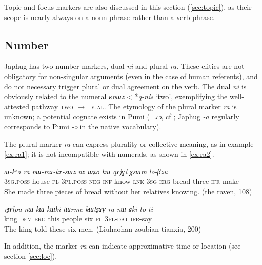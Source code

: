 \documentclass[oneside,a4paper,11pt]{article}
\newcommand{\ipa}[1]{\mbox{\phon\textit{#1}}} %
\begin{document}
Topic and focus markers are also discussed in this section (\ref{sec:topic}), as their scope is nearly always on a noun phrase rather than a verb phrase.

\subsection{Number} \label{sec:number}

Japhug has two number markers, dual \ipa{ni} and plural \ipa{ra}. These clitics are not obligatory for non-singular arguments (even in the case of human referents), and do not necessary trigger plural or dual agreement on the verb. The dual \ipa{ni} is obviously related to the numeral \ipa{ʁnɯz} < *\ipa{q-nis} `two', exemplifying the well-attested pathway \textsc{two} $\rightarrow$ \textsc{dual}. The etymology of the plural marker \ipa{ra} is unknown; a potential cognate exists in Pumi (\ipa{=ɹə}, cf \citealt[135]{daudey14grammar}; Japhug \ipa{-a} regularly corresponds to Pumi \ipa{-ə} in the native vocabulary).
 
  The plural marker \ipa{ra} can express plurality or collective meaning, as in example \ref{ex:ra1}; it is not incompatible with numerals, as shown in \ref{ex:ra2}.
 
\begin{exe}
\ex \label{ex:ra1}
\gll \ipa{ɯ-kʰa} 	\ipa{ra} 	\ipa{nɯ-mɤ-kɤ-sɯz} 	\ipa{nɤ} 	\ipa{ɯʑo} 	\ipa{kɯ} 	\ipa{qɤjɣi} 	\ipa{χsɯm} 	\ipa{lo-βzu} \\
\textsc{3sg.poss}-house \textsc{pl} \textsc{3pl.poss-neg-inf}-know \textsc{lnk} \textsc{3sg} \textsc{erg} bread three \textsc{ifr}-make \\
\glt She made three pieces of bread without her relatives knowing. (the raven, 108)
\end{exe}

\begin{exe}
\ex \label{ex:ra2}
\gll 
 \ipa{rɟɤlpu} 	\ipa{nɯ} 	\ipa{kɯ} 	\ipa{kɯki} 	\ipa{tɯrme} 	\ipa{kɯtʂɤɣ} 	\ipa{ra} 	\ipa{nɯ-ɕki}  	\ipa{to-ti} \\
 king \textsc{dem} \textsc{erg} this people six \textsc{pl} \textsc{3pl-dat} \textsc{ifr}-say  \\
 \glt The king told these six men. (Liuhaohan zoubian tianxia, 200)
\end{exe}

In addition, the marker \ipa{ra} can indicate approximative time or location  (see section  \ref{sec:loc}).
 
\end{document}
